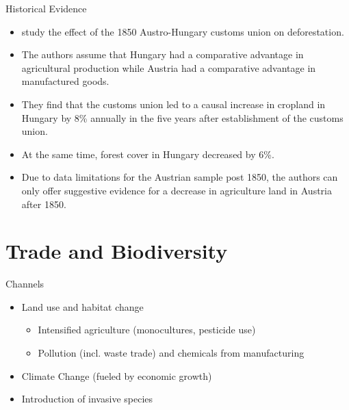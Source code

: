 \documentclass{beamer}
\begin{document}
\begin{frame}{Historical Evidence}
\begin{itemize}\small
    \item \textcite{Alix-Garcia_Walker_Radeloff_Kozak_2018} study the effect of the 1850 Austro-Hungary customs union on deforestation. 
    \item The authors assume that Hungary had a comparative advantage in agricultural production while Austria had a comparative advantage in manufactured goods.
    \item They find that the customs union led to a causal increase in cropland in Hungary by 8\% annually in the five years after establishment of the customs union. 
    \item At the same time, forest cover in Hungary decreased by 6\%.
    \item Due to data limitations for the Austrian sample post 1850, the authors can only offer suggestive evidence for a decrease in agriculture land in Austria after 1850.
\end{itemize}
\end{frame}

\section{Trade and Biodiversity}

\begin{frame}{Channels}
\begin{itemize} \small
    \item Land use and habitat change %
    \begin{itemize}
        \item Intensified agriculture (monocultures, pesticide use)
    \item Pollution (incl. waste trade) and chemicals from manufacturing
    \end{itemize}
    \item Climate Change (fueled by economic growth)
    \item Introduction of invasive species %
\end{itemize}    
\end{frame}
\end{document}
